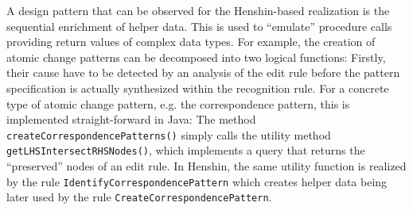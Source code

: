 \documentclass{llncs}
\begin{document}
A design pattern that can be observed for the Henshin-based 
realization is the sequential enrichment of helper data.
This is used to ``emulate'' procedure calls providing
return values of complex data types.
For example, the creation of atomic change patterns can
be decomposed into two logical functions: Firstly, their
cause have to be detected by an analysis of the edit rule
before the pattern specification is actually synthesized within
the recognition rule. For a concrete type of atomic change pattern,
e.g. the correspondence pattern, this is implemented straight-forward
in Java: The method \texttt{createCorrespondencePatterns()}
simply calls the utility method \texttt{getLHSIntersectRHSNodes()}, 
which implements a query that returns the ``preserved'' nodes of an
edit rule. In Henshin, the same utility function is realized 
by the rule \texttt{IdentifyCorrespondencePattern} which 
creates helper data being later used by the rule 
\texttt{CreateCorrespondencePattern}.
\end{document}
